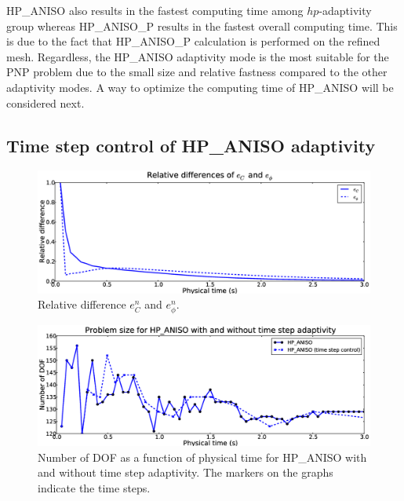 HP\_ANISO also results in the fastest
computing time among $hp$-adaptivity group whereas HP\_ANISO\_P
results in the fastest overall computing time. This is due to the fact
that HP\_ANISO\_P calculation is performed on the refined mesh. 
Regardless, the HP\_ANISO adaptivity mode is the most suitable
for the PNP problem due to the small size and relative fastness compared
to the other adaptivity modes. A way to optimize the computing time
of HP\_ANISO will be considered next.

\subsection{Time step control of HP\_ANISO adaptivity}

\begin{figure}[!ht]
  \begin{centering}
  \includegraphics[width=\columnwidth]{cphi_relerr}
  \caption{\label{fig:cphirelerr} Relative difference $e_{C}^n$ and $e_{\phi}^n$.}
  \end{centering}
\end{figure}
\begin{figure}[!ht]
  \begin{centering}
  \includegraphics[width=\columnwidth]{timeadapt_dof}
  \caption{\label{fig:timeadapt_dof} Number of DOF
  as a function of physical time for HP\_ANISO with and without
  time step adaptivity. The markers on the graphs indicate the
  time steps.}
  \end{centering}
\end{figure}
